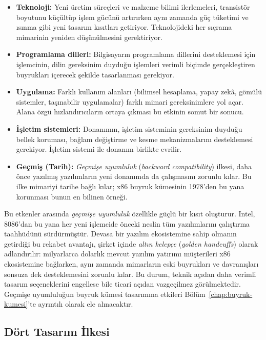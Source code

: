 \begin{itemize}
    \item \textbf{Teknoloji:} Yeni üretim süreçleri ve malzeme bilimi ilerlemeleri, transistör boyutunu küçültüp işlem gücünü artırırken aynı zamanda güç tüketimi ve ısınma gibi yeni tasarım kısıtları getiriyor. Teknolojideki her sıçrama mimarinin yeniden düşünülmesini gerektiriyor.
    \item \textbf{Programlama dilleri:} Bilgisayarın programlama dillerini desteklemesi için işlemcinin, dilin gereksinim duyduğu işlemleri verimli biçimde gerçekleştiren buyrukları içerecek şekilde tasarlanması gerekiyor.
    \item \textbf{Uygulama:} Farklı kullanım alanları (bilimsel hesaplama, yapay zekâ, gömülü sistemler, taşınabilir uygulamalar) farklı mimari gereksinimlere yol açar. Alana özgü hızlandırıcıların ortaya çıkması bu etkinin somut bir sonucu.
    \item \textbf{İşletim sistemleri:} Donanımın, işletim sisteminin gereksinim duyduğu bellek koruması, bağlam değiştirme ve kesme mekanizmalarını desteklemesi gerekiyor. İşletim sistemi ile donanım birlikte evrilir.
    \item \textbf{Geçmiş (Tarih):} \emph{Geçmişe uyumluluk} (\emph{backward compatibility}) ilkesi, daha önce yazılmış yazılımların yeni donanımda da çalışmasını zorunlu kılar. Bu ilke mimariyi tarihe bağlı kılar; x86 buyruk kümesinin 1978'den bu yana korunması bunun en bilinen örneği.
\end{itemize}

Bu etkenler arasında \emph{geçmişe uyumluluk} özellikle güçlü bir kısıt oluşturur. Intel, 8086'dan bu yana her yeni işlemcide önceki neslin tüm yazılımlarını çalıştırma taahhüdünü sürdürmüştür. Devasa bir yazılım ekosistemine sahip olmanın getirdiği bu rekabet avantajı, şirket içinde \emph{altın kelepçe} (\emph{golden handcuffs}) olarak adlandırılır: milyarlarca dolarlık mevcut yazılım yatırımı müşterileri x86 ekosistemine bağlarken, aynı zamanda mimarların eski buyrukları ve davranışları sonsuza dek desteklemesini zorunlu kılar. Bu durum, teknik açıdan daha verimli tasarım seçeneklerini engellese bile ticari açıdan vazgeçilmez görülmektedir. Geçmişe uyumluluğun buyruk kümesi tasarımına etkileri Bölüm~\ref{chap:buyruk-kumesi}'te ayrıntılı olarak ele alınacaktır.

\subsection{Dört Tasarım İlkesi}
\label{sec:tasarim-ilkeleri}

